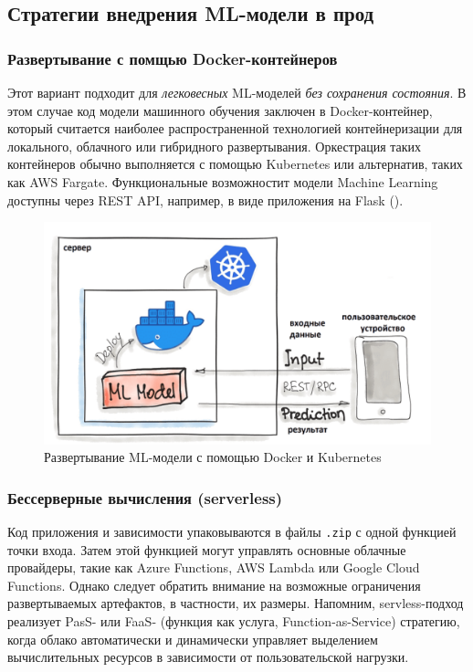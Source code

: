 \documentclass[%
	11pt,
	a4paper,
	utf8,
		]{article}
\begin{document}
\subsection{Стратегии внедрения ML-модели в прод}

\subsubsection{Развертывание с помщью Docker-контейнеров}

Этот вариант подходит для \emph{легковесных} ML-моделей \emph{без сохранения состояния}. В этом случае код модели машинного обучения заключен в Docker-контейнер, который считается наиболее распространенной технологией контейнеризации для локального, облачного или гибридного развертывания. Оркестрация таких контейнеров обычно выполняется с помощью Kubernetes или альтернатив, таких как AWS Fargate. Функциональные возможностит модели Machine Learning доступны через REST API, например, в виде приложения на Flask ().

 \begin{figure}[h]
	\centering
	\includegraphics[scale=0.6]{figures/ml_model_docker_kube.png}
	\caption{ Развертывание ML-модели с помощью Docker и Kubernetes }\label{fig:ml_model_docker_kube}
\end{figure}

\subsubsection{Бессерверные вычисления (serverless)}

Код приложения и зависимости упаковываются в файлы \verb|.zip| с одной функцией точки входа. Затем этой функцией могут управлять основные облачные провайдеры, такие как Azure Functions, AWS Lambda или Google Cloud Functions. Однако следует обратить внимание на возможные ограничения развертываемых артефактов, в частности, их размеры. Напомним, servless-подход реализует PasS- или FaaS- (функция как услуга, Function-as-Service) стратегию, когда облако автоматически и динамически управляет выделением вычислительных ресурсов в зависимости от пользовательской нагрузки.
\end{document}

